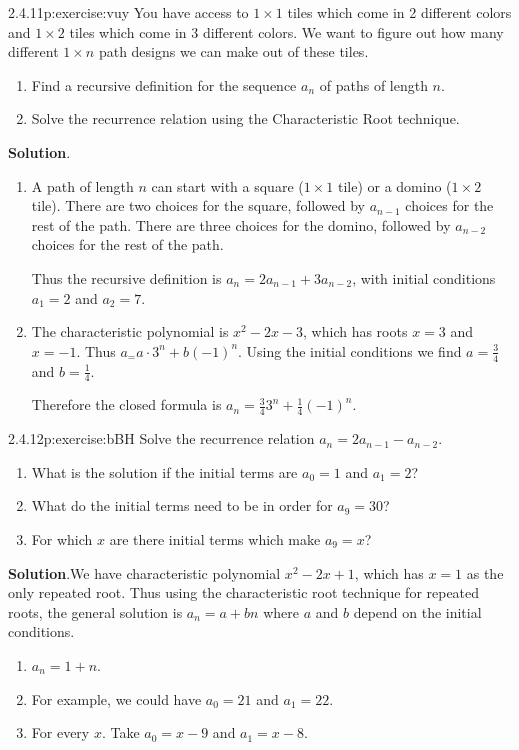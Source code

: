 \documentclass[twoside,11pt,]{book}
\newcommand{\blocktitlefont}{\relax}
\numberwithin{equation}{chapter}
\begin{document}
\begin{divisionsolution}{2.4.11}{}{p:exercise:vuy}%
You have access to \(1 \times 1\) tiles which come in 2 different colors and \(1\times 2\) tiles which come in 3 different colors. We want to figure out how many different \(1 \times n\) path designs we can make out of these tiles.%
\begin{enumerate}[label=(\alph*)]
\item{}Find a recursive definition for the sequence \(a_n\) of paths of length \(n\).%
\item{}Solve the recurrence relation using the Characteristic Root technique.%
\end{enumerate}
%
\par\smallskip%
\noindent\textbf{\blocktitlefont Solution}.\quad{}%
\begin{enumerate}[label=(\alph*)]
\item{}A path of length \(n\) can start with a square (\(1\times 1\) tile) or a domino (\(1\times 2\) tile).  There are two choices for the square, followed by \(a_{n-1}\) choices for the rest of the path.  There are three choices for the domino, followed by \(a_{n-2}\) choices for the rest of the path.%
\par
Thus the recursive definition is \(a_n = 2a_{n-1} + 3 a_{n-2}\), with initial conditions \(a_1 = 2\) and \(a_2 = 7\).%
\item{}The characteristic polynomial is \(x^2 - 2x - 3\), which has roots \(x = 3\) and \(x = -1\).  Thus \(a_ = a\cdot 3^n + b (-1)^n\).  Using the initial conditions we find \(a = \frac{3}{4}\) and \(b = \frac{1}{4}\).%
\par
Therefore the closed formula is \(a_n = \frac{3}{4}3^n + \frac{1}{4}(-1)^n\).%
\end{enumerate}
%
\end{divisionsolution}%
\begin{divisionsolution}{2.4.12}{}{p:exercise:bBH}%
Solve the recurrence relation \(a_n = 2a_{n-1} - a_{n-2}\).%
\begin{enumerate}[label=(\alph*)]
\item{}What is the solution if the initial terms are \(a_0 = 1\) and \(a_1 = 2\)?%
\item{}What do the initial terms need to be in order for \(a_9 = 30\)?%
\item{}For which \(x\) are there initial terms which make \(a_9 = x\)?%
\end{enumerate}
%
\par\smallskip%
\noindent\textbf{\blocktitlefont Solution}.\quad{}We have characteristic polynomial \(x^2 - 2x + 1\), which has \(x = 1\) as the only repeated root. Thus using the characteristic root technique for repeated roots, the general solution is \(a_n = a + bn\) where \(a\) and \(b\) depend on the initial conditions.%
\begin{enumerate}[label=(\alph*)]
\item{}\(a_n = 1 + n\).%
\item{}For example, we could have \(a_0 = 21\) and \(a_1 = 22\).%
\item{}For every \(x\). Take \(a_0 = x-9\) and \(a_1 = x-8\).%
\end{enumerate}
%
\end{divisionsolution}%
\end{document}
